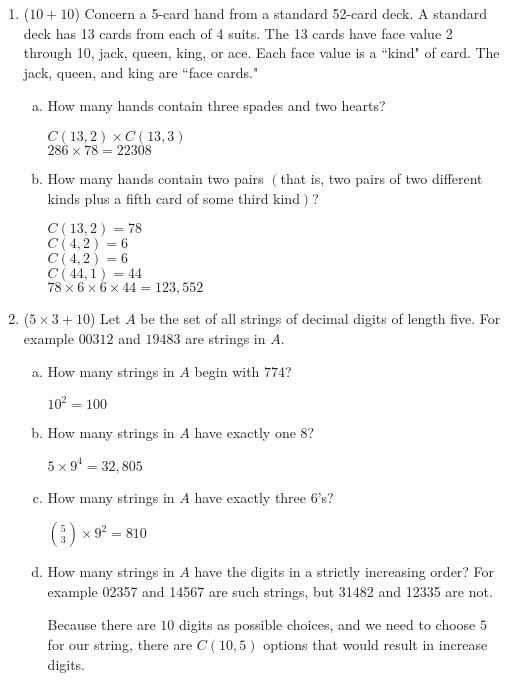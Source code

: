 \documentclass[12pt]{article}
\begin{document}
	\begin{enumerate}

		\item ($10 + 10$)
		Concern a 5-card hand from a standard 52-card deck. A standard deck has 13 cards from each of 4 suits. The 13 cards have face value 2 through 10, jack, queen, king, or ace. Each face value is a ``kind" of card. The jack, queen, and king are ``face cards."
		\begin{enumerate}[a.]
			\item How many hands contain three spades and two hearts?

			$C(13,2) \times C(13,3)$\\
			$286 \times 78 = 22308$

			\item How many hands contain two pairs $\left( \right.$that is, two pairs of two different kinds plus a fifth card of some third kind$\left. \right)$?

			$C(13, 2) = 78$\\
			$C(4,2) = 6$\\
			$C(4,2) = 6$\\
			$C(44,1)= 44$\\
			$78 \times 6 \times 6 \times 44 = 123,552$
		\end{enumerate}



		\newpage
		\item ($5 \times 3 + 10$)
		Let $A$ be the set of all strings of decimal digits of length five. For example $00312$ and $19483$ are strings in $A$.
		\begin{enumerate}[a.]
			\item How many strings in $A$ begin with $774$?

			$10^2 = 100$

			\item How many strings in $A$ have exactly one $8$?

			$5 \times 9^4 = 32,805$

			\item How many strings in $A$ have exactly three $6$'s?

			${5 \choose 3} \times 9^2 = 810$

			\item How many strings in $A$ have the digits in a strictly increasing order? For example 02357 and 14567 are such strings, but 31482 and 12335 are not.


			Because there are $10$ digits as possible choices, and we need to choose $5$ for our string, there are $C(10,5)$ options that would result in increase digits.


\end{enumerate}
\end{enumerate}
\end{document}
